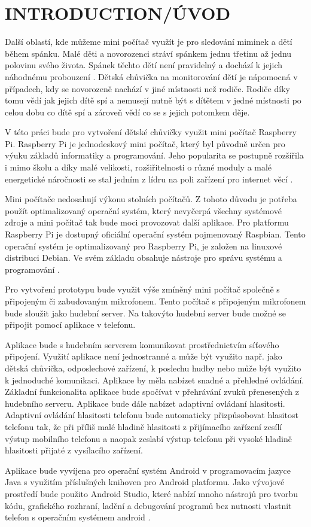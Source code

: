 \documentclass[journal, a4paper]{IEEEtran}
\begin{document}
\section{INTRODUCTION/ÚVOD}
Další oblastí, kde můžeme mini počítač využít je pro sledování miminek a dětí během spánku. Malé děti a novorozenci stráví spánkem jednu třetinu až jednu polovinu svého života. Spánek těchto dětí není pravidelný a dochází k jejich náhodnému probouzení \cite{childsleep}. Dětská chůvička na monitorování dětí je nápomocná v případech, kdy se novorozeně nachází v jiné místnosti než rodiče. Rodiče díky tomu vědí jak jejich dítě spí a nemusejí nutně být s dítětem v jedné místnosti po celou dobu co dítě spí a zároveň vědí co se s jejich potomkem děje. \par
V této práci bude pro vytvoření dětské chůvičky využit mini počítač Raspberry Pi. Raspberry Pi je jednodeskový mini počítač, který byl původně určen pro výuku základů informatiky a programování. Jeho popularita se postupně rozšířila i mimo školu a díky malé velikosti, rozšiřitelnosti o různé moduly a malé energetické náročnosti se stal jedním z lídru na poli zařízení pro internet věcí \cite{raspberryweb}. \par
Mini počítače nedosahují výkonu stolních počítačů. Z tohoto důvodu je potřeba použít optimalizovaný operační systém, který nevyčerpá všechny systémové zdroje a mini počítač tak bude moci provozovat další aplikace. Pro platformu Raspberry Pi je dostupný oficiální operační systém pojmenovaný Raspbian. Tento operační systém je optimalizovaný pro Raspberry Pi, je založen na linuxové distribuci Debian. Ve svém základu obsahuje nástroje pro správu systému a programování \cite{raspbian}. \par
Pro vytvoření prototypu bude využit výše zmíněný mini počítač společně s připojeným či zabudovaným mikrofonem. Tento počítač s připojeným mikrofonem bude sloužit jako hudební server. Na takovýto hudební server bude možné se připojit pomocí aplikace v telefonu. \par
Aplikace bude s hudebním serverem komunikovat prostřednictvím síťového připojení. Využití aplikace není jednostranné a může být využito např. jako dětská chůvička, odposlechové zařízení, k poslechu hudby nebo může být využito k jednoduché komunikaci. Aplikace by měla nabízet snadné a přehledné ovládání. Základní funkcionalita aplikace bude spočívat v přehrávání zvuků přenesených z hudebního serveru. Aplikace bude dále nabízet adaptivní ovládaní hlasitosti. Adaptivní ovládání hlasitosti telefonu bude automaticky přizpůsobovat hlasitost telefonu tak, že při příliš malé hladině hlasitosti z přijímacího zařízení zesílí výstup mobilního telefonu a naopak zeslabí výstup telefonu při vysoké hladině hlasitosti přijaté z vysílacího zařízení. \par
Aplikace bude vyvíjena pro operační systém Android v programovacím jazyce Java s využitím příslušných knihoven pro Android platformu. Jako vývojové prostředí bude použito Android Studio, které nabízí mnoho nástrojů pro tvorbu kódu, grafického rozhraní, ladění a debugování programů bez nutnosti vlastnit telefon s operačním systémem android \cite{androidstudio}.
\end{document}

